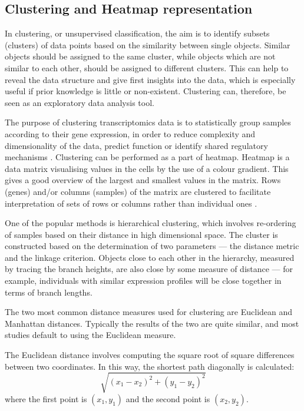  
  
    \subsection{Clustering and Heatmap representation} \label{section:clustEDA}
    
    In clustering, or unsupervised classification, the aim is to identify subsets (clusters) of data points based on the similarity between single objects. Similar objects should be assigned to the same cluster, while objects which are not similar to each other, should be assigned to different clusters. This can help to reveal the data structure and give first insights into the data, which is especially useful if prior knowledge is little or non-existent. Clustering can, therefore, be seen as an exploratory data analysis tool. 
        
    The purpose of clustering transcriptomics data is to statistically group samples according to their gene expression, in order to reduce complexity and dimensionality of the data, predict function or identify shared regulatory mechanisms \cite{Metsalu2015ClustVis:Heatmap}. Clustering can be performed as a part of heatmap. Heatmap is a data matrix visualising values in the cells by the use of a colour gradient. This gives a good overview of the largest and smallest values in the matrix. Rows (genes) and/or columns (samples) of the matrix are clustered to facilitate interpretation of sets of rows or columns rather than individual ones \cite{Metsalu2015ClustVis:Heatmap}.
    
    \newpage
    One of the popular methods is hierarchical clustering, which involves re-ordering of samples based on their distance in high dimensional space. The cluster is constructed based on the determination of two parameters — the distance metric and the linkage criterion. Objects close to each other in the hierarchy, measured by tracing the branch heights, are also close by some measure of distance — for example, individuals with similar expression profiles will be close together in terms of branch lengths.
    
    
    The two most common distance measures used for clustering are Euclidean and Manhattan distances. Typically the results of the two are quite similar, and most studies default to using the Euclidean measure. 
    
    The Euclidean distance involves computing the square root of square differences between two coordinates. In this way, the shortest path diagonally is calculated: $$ \sqrt{(x_{1}-x_{2})^{2}+(y_{1}-y_{2})^{2}}$$ where the first point is $(x_1, y_1)$ and the second point is $(x_2, y_2).$
    
